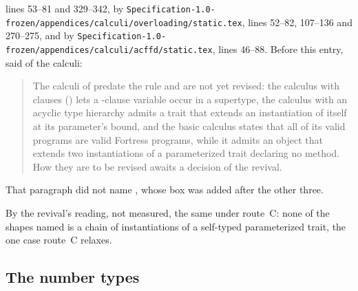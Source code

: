 \begin{description}
lines 53--81 and 329--342, by
\nolinkurl{Specification-1.0-frozen/appendices/calculi/overloading/static.tex},
lines 52--82, 107--136 and 270--275, and by
\nolinkurl{Specification-1.0-frozen/appendices/calculi/acffd/static.tex},
lines 46--88.
Before this entry,  said of the calculi:
\begin{quote}
The calculi of  predate the rule and are not yet revised:
the calculus with  clauses () lets a
-clause variable occur in a supertype, the calculus with an
acyclic type hierarchy admits a trait that extends an instantiation of
itself at its parameter's bound, and the basic calculus states that all of
its valid programs are valid Fortress programs, while it admits an object
that extends two instantiations of a parameterized trait declaring no
method.
How they are to be revised awaits a decision of the revival.
\end{quote}
That paragraph did not name \overloadingcore, whose box was added after
the other three.
\item[Route C] By the revival's reading, not measured, the same under
route~C: none of the shapes named is a chain of instantiations of a
self-typed parameterized trait, the one case route~C relaxes.
\end{description}

\subsection{The number types}

